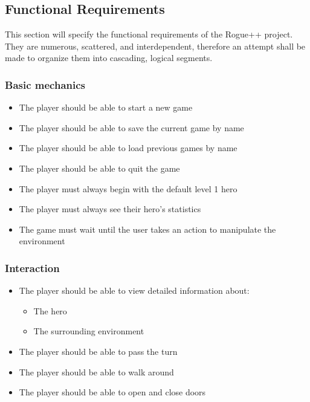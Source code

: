 \documentclass[12pt, titlepage]{article}
\begin{document}
	\subsection{Functional Requirements}

	This section will specify the functional requirements of the Rogue++ project. They are numerous, scattered, and interdependent, therefore an attempt shall be made to organize them into cascading, logical segments.

		\subsubsection{Basic mechanics}

		\begin{itemize}
			\item The player should be able to start a new game
			\item The player should be able to save the current game by name
			\item The player should be able to load previous games by name
			\item The player should be able to quit the game
			\item The player must always begin with the default level 1 hero
			\item The player must always see their hero's statistics
			\item The game must wait until the user takes an action to manipulate the environment
		\end{itemize}

		\subsubsection{Interaction}
		\begin{itemize}
			\item The player should be able to view detailed information about:
			\begin{itemize}
				\item The hero
				\item The surrounding environment
			\end{itemize}
			\item The player should be able to pass the turn
			\item The player should be able to walk around
			\item The player should be able to open and close doors
		\end{itemize}
\end{document}
